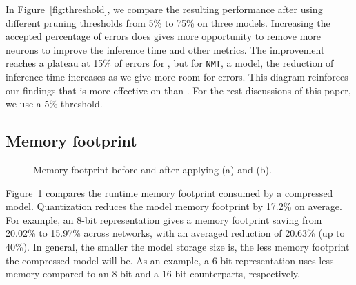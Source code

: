 In Figure~\ref{fig:threshold}, we compare the resulting performance after using different pruning thresholds from 5\% to 75\% on three \CNN
models. Increasing the accepted percentage of errors does gives \pruning more opportunity to remove more neurons to improve the inference
time and other metrics. The improvement reaches a plateau at 15\% of errors for \CNNs, but for \texttt{NMT}, a \RNN model, the reduction of
inference time increases as we give more room for errors. This diagram reinforces our findings that \pruning is more effective on \RNNs
than \CNNs. For the rest discussions of this paper, we use a 5\% \pruning threshold.




\subsection{Memory footprint}

\begin{figure}[!t]
\centering
{}
\hfill
{}
\hfill

\caption{Memory footprint before and after applying \quantization(a) and \pruning (b).} \label{fig:footprint}
\end{figure}

Figure~\ref{fig:footprint} compares the runtime memory footprint consumed by a compressed model. Quantization reduces the model memory
footprint by 17.2\% on average. For example, an 8-bit representation gives a memory footprint saving from 20.02\% to 15.97\% across
networks, with an averaged reduction of 20.63\% (up to 40\%). In general, the smaller the model storage size is, the less memory footprint
the compressed model will be. As an example, a 6-bit representation uses  less memory compared to an 8-bit and a 16-bit
counterparts, respectively.

